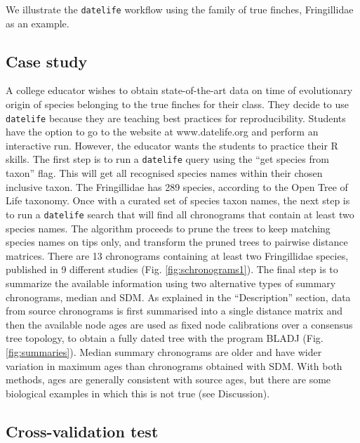 \documentclass[
  english,
  man]{apa6}
\begin{document}
We illustrate the \texttt{datelife} workflow using the family of true finches, Fringillidae as an example.

\hypertarget{case-study}{%
\subsection{Case study}\label{case-study}}

A college educator wishes to obtain state-of-the-art data on time of evolutionary origin of species belonging to the true finches for their class. They decide to use \texttt{datelife} because they are teaching best practices for reproducibility.
Students have the option to go to the website at www.datelife.org and perform an interactive run. However, the educator wants the students to practice their R skills.
The first step is to run a \texttt{datelife} query using the ``get species from taxon'' flag. This will get all recognised species names within their chosen inclusive taxon. The Fringillidae has 289 species, according to the Open Tree of Life taxonomy.
Once with a curated set of species taxon names, the next step is to run a \texttt{datelife} search that will find all chronograms that contain at least two species names. The algorithm proceeds to prune the trees to keep matching species names on tips only, and transform the pruned trees to pairwise distance matrices.
There are 13 chronograms containing at least two Fringillidae species, published in 9 different studies (Fig. \ref{fig:schronograms1}).
The final step is to summarize the available information using two alternative types of summary chronograms, median and SDM. As explained in the ``Description'' section, data from source chronograms is first summarised into a single distance matrix and then the available node ages are used as fixed node calibrations over a consensus tree topology, to obtain a fully dated tree with the program BLADJ (Fig. \ref{fig:summaries}). Median summary chronograms are older and have wider variation in maximum ages than chronograms obtained with SDM. With both methods, ages are generally consistent with source ages, but there are some biological examples in which this is not true (see Discussion).

\hypertarget{cross-validation-test}{%
\subsection{Cross-validation test}\label{cross-validation-test}}
\end{document}
